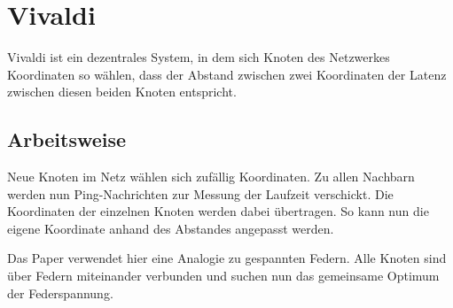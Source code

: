 \section{Vivaldi}
\label{chap:related:vivaldi}
Vivaldi \cite{citeulike:162250} ist ein dezentrales System, in dem sich Knoten des Netzwerkes Koordinaten so wählen, dass der Abstand zwischen zwei Koordinaten der Latenz zwischen diesen beiden Knoten entspricht.

\subsection{Arbeitsweise}
Neue Knoten im Netz wählen sich zufällig Koordinaten. Zu allen Nachbarn werden nun Ping-Nachrichten zur Messung der Laufzeit verschickt. Die Koordinaten der einzelnen Knoten werden dabei übertragen. So kann nun die eigene Koordinate anhand des Abstandes angepasst werden.

Das Paper verwendet hier eine Analogie zu gespannten Federn. Alle Knoten sind über Federn miteinander verbunden und suchen nun das gemeinsame Optimum der Federspannung.
